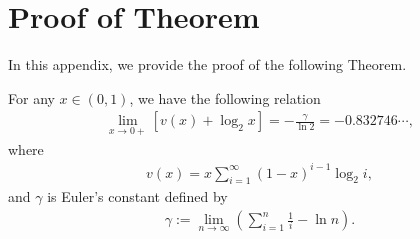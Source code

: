 \section{Proof of Theorem}
In this appendix, we provide the proof of the following Theorem.
\begin{theorem}
For any $x\in(0,1)$, we have the following relation
\begin{align}
	\lim_{x\to 0+} \left[ v(x) + \log_2 x \right] = -\frac{\gamma}{\ln 2} = -0.832746\cdots,
\end{align}
where
\begin{align}
	v(x) = x\sum_{i=1}^{\infty} (1-x)^{i-1}\log_2 i,
\end{align}
and $\gamma$ is Euler's constant defined by
\begin{align}\label{eq:gamma_def}
	\gamma := \lim_{n\to\infty}\left(\sum_{i=1}^{n} \frac{1}{i}-\ln n\right).
\end{align}
\end{theorem}
%
